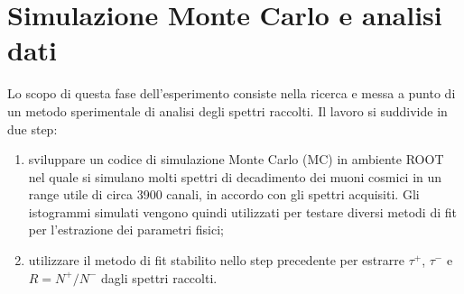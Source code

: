 \documentclass[10pt, oneside, a4paper]{article}   	%
\begin{document}
%
\cleardoublepage
\section{Simulazione Monte Carlo e analisi dati}
Lo scopo di questa fase dell'esperimento consiste nella ricerca e messa a punto di un metodo sperimentale di analisi degli spettri raccolti. Il lavoro si suddivide in due step:
\begin{enumerate}
 \item sviluppare un codice di simulazione Monte Carlo (MC) in ambiente ROOT nel quale si simulano molti spettri di decadimento dei muoni cosmici in un range utile di circa 3900 canali, in accordo con gli spettri acquisiti. Gli istogrammi simulati vengono quindi utilizzati per testare diversi metodi di fit per l'estrazione dei parametri fisici;
 \item utilizzare il metodo di fit stabilito nello step precedente per estrarre $\tau^+$, $\tau^-$ e $R=N^+/N^-$ dagli spettri raccolti.
\end{enumerate}
%
\end{document}
